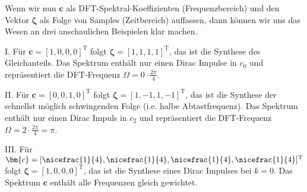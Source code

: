 Wenn wir nun $\bm{c}$ als DFT-Spektral-Koeffizienten (Frequenzbereich) und
den Vektor $\bm{\zeta}$ als Folge von Samples (Zeitbereich) auffassen,
dann können wir uns das Wesen an drei anschaulichen Beispielen klar machen.

I. Für $\bm{c} = [1,0,0,0]^\mathrm{T}$ folgt $\bm{\zeta} = [1,1,1,1]^\mathrm{T}$,
das ist die Synthese des Gleichanteils. Das Spektrum enthält nur einen Dirac Impulse
in $c_0$ und repräsentiert die DFT-Frequenz $\Omega = 0 \cdot \frac{2\pi}{4}$.

II. Für $\bm{c} = [0,0,1,0]^\mathrm{T}$ folgt $\bm{\zeta} = [1,-1,1,-1]^\mathrm{T}$,
das ist die Synthese der schnellst möglich schwingenden Folge (i.e. halbe Abtastfrequenz).
Das Spektrum enthält nur einen Dirac Impuls in $c_2$
und repräsentiert die DFT-Frequenz $\Omega = 2 \cdot \frac{2\pi}{4} = \pi$.

III. Für $\bm{c} = [\nicefrac{1}{4},\nicefrac{1}{4},\nicefrac{1}{4},\nicefrac{1}{4}]^\mathrm{T}$
folgt $\bm{\zeta} = [1,0,0,0]^\mathrm{T}$,
das ist die Synthese eines Dirac Impulses bei $k=0$.
Das Spektrum $\bm{c}$ enthält alle Frequenzen gleich gewichtet.


